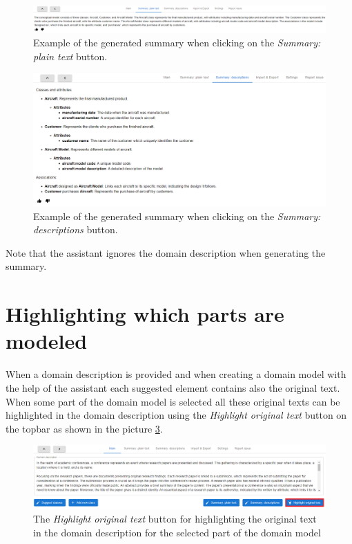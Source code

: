 \begin{figure}[!h]
    \includegraphics[scale=0.295]{../docs/images/frontend/summary-plain-text.png}
    \caption{\centering Example of the generated summary when clicking on the \textit{Summary: plain text} button.}
    \label{fig:summary_plain_text}
\end{figure}

\begin{figure}[!h]
    \includegraphics[scale=0.41]{../docs/images/frontend/summary-descriptions.png}
    \caption{\centering Example of the generated summary when clicking on the \textit{Summary: descriptions} button.}
    \label{fig:summary_description}
\end{figure}

Note that the assistant ignores the domain description when generating the summary.


\section{Highlighting which parts are modeled}

When a domain description is provided and when creating a domain model with the help of the assistant each suggested element contains also the original text. When some part of the domain model is selected all these original texts can be highlighted in the domain description using the \textit{Highlight original text} button on the topbar as shown in the picture \ref{fig:highlight_original_text_button}.

\begin{figure}[!h]
    \includegraphics[scale=0.36]{../docs/images/frontend/highlight-original-text-button.png}
    \caption{\centering The \textit{Highlight original text} button for highlighting the original text in the domain description for the selected part of the domain model}
    \label{fig:highlight_original_text_button}
\end{figure}

